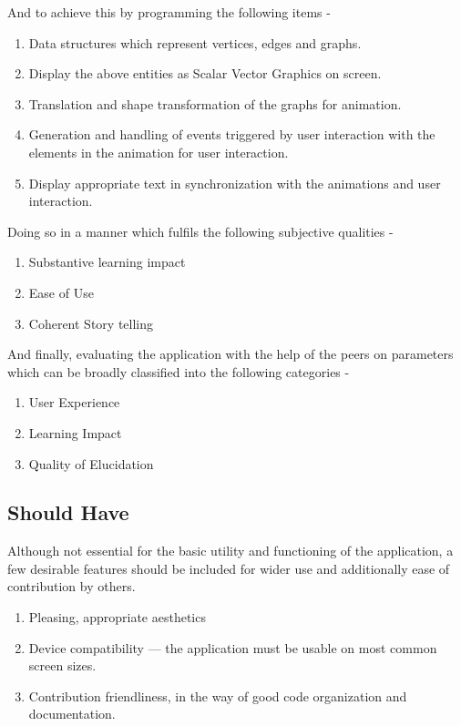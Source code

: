 And to achieve this by programming the following items -

\begin{enumerate}
\item Data structures which represent vertices, edges and graphs.
\item Display the above entities as Scalar Vector Graphics on screen.
\item Translation and shape transformation of the graphs for animation.
\item Generation and handling of events triggered by user interaction with the elements in the animation for user interaction.
\item Display appropriate text in synchronization with the animations and user interaction.
\end{enumerate}

Doing so in a manner which fulfils the following subjective qualities -

\begin{enumerate}
\item Substantive learning impact
\item Ease of Use
\item Coherent Story telling
\end{enumerate}

And finally, evaluating the application with the help of the peers on
parameters which can be broadly classified into the following categories -

\begin{enumerate}
\item User Experience
\item Learning Impact
\item Quality of Elucidation
\end{enumerate}

\subsection{Should Have}
\label{requirements: shouldhave}
Although not essential for the basic utility and functioning of
the application, a few desirable features should be included for wider use and
additionally ease of contribution by others. 
\begin{enumerate}
\item Pleasing, appropriate aesthetics
\item Device compatibility --- the application must be usable on most common screen sizes.
\item Contribution friendliness, in the way of good code organization and documentation.
\end{enumerate}


